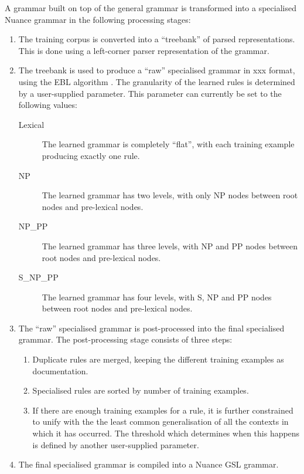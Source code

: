 \documentclass[11pt,twoside]{article}
\begin{document}
A grammar built on top of the general grammar is transformed into a
specialised Nuance grammar in the following processing stages:
\begin{enumerate}

\item The training corpus is converted into a ``treebank'' of parsed
representations. This is done using a left-corner parser
representation of the grammar.

\item The treebank is used to produce a ``raw'' specialised grammar in
{\sc xxx} format, using the EBL algorithm
\cite{VanHarmelenBundy88,Rayner88}. The granularity of the learned
rules is determined by a user-supplied parameter. This parameter can
currently be set to the following values:

\begin{description}

\item[Lexical] The learned grammar is completely ``flat'', with each
training example producing exactly one rule.

\item[NP] The learned grammar has two levels, with only NP nodes between root nodes and pre-lexical nodes. 

\item[NP\_PP] The learned grammar has three levels, with NP and PP
nodes between root nodes and pre-lexical nodes.

\item[S\_NP\_PP] The learned grammar has four levels, with S, NP and
PP nodes between root nodes and pre-lexical nodes.

\end{description}

\item The ``raw'' specialised grammar is post-processed into the final specialised grammar. 
The post-processing stage consists of three steps: 

\begin{enumerate}

\item Duplicate rules are merged, keeping the different training examples as documentation. 

\item Specialised rules are sorted by number of training examples. 

\item If there are enough training examples for a rule, it is further
constrained to unify with the the least common generalisation of all
the contexts in which it has occurred. The threshold which determines
when this happens is defined by another user-supplied parameter.

\end{enumerate}

\item The final specialised grammar is compiled into a
Nuance GSL grammar.

\end{enumerate}
\end{document}

